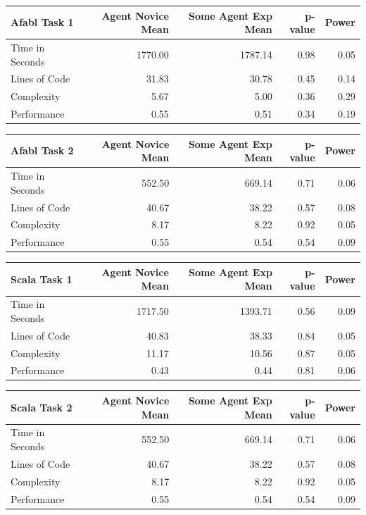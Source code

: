 \begin{center}
\begin{table}[h]
\begin{center}

\begin{tabular}{|l|r|r|r|r|}\hline
Afabl Task 1 & Agent Novice Mean & Some Agent Exp Mean & p-value & Power\\\hline
Time in Seconds & 1770.00 & 1787.14 & 0.98 & 0.05\\
Lines of Code & 31.83 & 30.78 & 0.45 & 0.14\\
Complexity & 5.67 & 5.00 & 0.36 & 0.29\\
Performance & 0.55 & 0.51 & 0.34 & 0.19\\
\hline
\end{tabular}


\begin{tabular}{|l|r|r|r|r|}\hline
Afabl Task 2 & Agent Novice Mean & Some Agent Exp Mean & p-value & Power\\\hline
Time in Seconds & 552.50 & 669.14 & 0.71 & 0.06\\
Lines of Code & 40.67 & 38.22 & 0.57 & 0.08\\
Complexity & 8.17 & 8.22 & 0.92 & 0.05\\
Performance & 0.55 & 0.54 & 0.54 & 0.09\\
\hline
\end{tabular}


\begin{tabular}{|l|r|r|r|r|}\hline
Scala Task 1 & Agent Novice Mean & Some Agent Exp Mean & p-value & Power\\\hline
Time in Seconds & 1717.50 & 1393.71 & 0.56 & 0.09\\
Lines of Code & 40.83 & 38.33 & 0.84 & 0.05\\
Complexity & 11.17 & 10.56 & 0.87 & 0.05\\
Performance & 0.43 & 0.44 & 0.81 & 0.06\\
\hline
\end{tabular}


\begin{tabular}{|l|r|r|r|r|}\hline
Scala Task 2 & Agent Novice Mean & Some Agent Exp Mean & p-value & Power\\\hline
Time in Seconds & 552.50 & 669.14 & 0.71 & 0.06\\
Lines of Code & 40.67 & 38.22 & 0.57 & 0.08\\
Complexity & 8.17 & 8.22 & 0.92 & 0.05\\
Performance & 0.55 & 0.54 & 0.54 & 0.09\\
\hline
\end{tabular}


\end{center}
\end{table}
\end{center}
